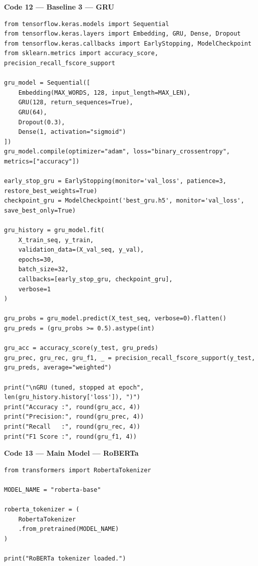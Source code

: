 \documentclass[11pt,a4paper]{article}
\begin{document}
\noindent\textbf{Code 12 --- Baseline 3 — GRU}
\begin{lstlisting}
from tensorflow.keras.models import Sequential
from tensorflow.keras.layers import Embedding, GRU, Dense, Dropout
from tensorflow.keras.callbacks import EarlyStopping, ModelCheckpoint
from sklearn.metrics import accuracy_score, precision_recall_fscore_support

gru_model = Sequential([
    Embedding(MAX_WORDS, 128, input_length=MAX_LEN),
    GRU(128, return_sequences=True),
    GRU(64),
    Dropout(0.3),
    Dense(1, activation="sigmoid")
])
gru_model.compile(optimizer="adam", loss="binary_crossentropy", metrics=["accuracy"])

early_stop_gru = EarlyStopping(monitor='val_loss', patience=3, restore_best_weights=True)
checkpoint_gru = ModelCheckpoint('best_gru.h5', monitor='val_loss', save_best_only=True)

gru_history = gru_model.fit(
    X_train_seq, y_train,
    validation_data=(X_val_seq, y_val),
    epochs=30,
    batch_size=32,
    callbacks=[early_stop_gru, checkpoint_gru],
    verbose=1
)

gru_probs = gru_model.predict(X_test_seq, verbose=0).flatten()
gru_preds = (gru_probs >= 0.5).astype(int)

gru_acc = accuracy_score(y_test, gru_preds)
gru_prec, gru_rec, gru_f1, _ = precision_recall_fscore_support(y_test, gru_preds, average="weighted")

print("\nGRU (tuned, stopped at epoch", len(gru_history.history['loss']), ")")
print("Accuracy :", round(gru_acc, 4))
print("Precision:", round(gru_prec, 4))
print("Recall   :", round(gru_rec, 4))
print("F1 Score :", round(gru_f1, 4))
\end{lstlisting}

\noindent\textbf{Code 13 --- Main Model — RoBERTa}
\begin{lstlisting}
from transformers import RobertaTokenizer

MODEL_NAME = "roberta-base"

roberta_tokenizer = (
    RobertaTokenizer
    .from_pretrained(MODEL_NAME)
)

print("RoBERTa tokenizer loaded.")
\end{lstlisting}
\end{document}
